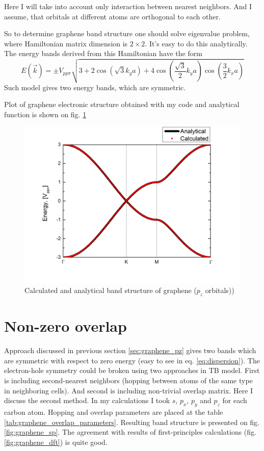 Here I will take into account only interaction between nearest neighbors. And I assume, that orbitals at different atoms are orthogonal to each other.

So to determine graphene band structure one should solve eigenvalue problem, where Hamiltonian matrix dimension is $2 \times 2$. It's easy to do this analytically. The energy bands derived from this Hamiltonian have the form \cite{wallace}
\begin{equation} \label{eq:dispersion}
	E(\vec{k}) = \pm V_{pp\pi}\sqrt{3 + 2 \cos\left(\sqrt{3} k_y a\right) + 4 \cos\left(\frac{\sqrt{3}}{2} k_y a\right) \cos\left(\frac{3}{2} k_x a\right)} 
\end{equation}
Such model gives two energy bands, which are symmetric.

Plot of graphene electronic structure obtained with my code and analytical function is shown on fig. \ref{fig:graphene_pz}
\begin{figure}[ht]
\begin{center}
  \includegraphics[width=0.6\linewidth]{img/graphene_pz}
  \caption{Calculated and analytical band structure of graphene ($p_z$ orbitals)) \label{fig:graphene_pz}}
\end{center}
\end{figure}

\section{Non-zero overlap}
\label{subsec:graphene_result}
Approach discussed in previous section \ref{sec:graphene_pz} gives two bands which are symmetric with respect to zero energy (easy to see in eq. \ref{eq:dispersion}). The electron-hole symmetry could be broken using two approaches in TB model. First is including second-nearest neighbors (hopping between atoms of the same type in neighboring cells). And second is including non-trivial overlap matrix. Here I discuss the second method.
In my calculations I took $s$, $p_x$, $p_y$ and $p_z$ for each carbon atom. Hopping and overlap parameters \cite{basics} are placed at the table \ref{tab:graphene_overlap_parameters}. Resulting band structure is presented on fig. \ref{fig:graphene_sp}. The agreement with results of first-principles calculations \cite{boukhvalov} (fig. \ref{fig:graphene_dft}) is quite good.

